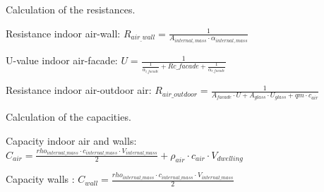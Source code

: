 Calculation of the resistances.
\newline

Resistance indoor air-wall: $R_{air_{\_}wall} = \frac{1}{A_{internal,mass} \cdot \alpha_{internal,mass}} $ 

U-value indoor air-facade: $U =\frac{1}{\frac{1}{\alpha_{i{\_}facade}}   + R{c{\_}facade} + \frac{1}{\alpha_{e{\_}facade}}}$ 

Resistance indoor air-outdoor air: $R_{air{\_}outdoor} = \frac{1}{A_{facade} \cdot U + A_{glass} \cdot U_{glass} + qm \cdot c_{air}}$ 
\newline

Calculation of the capacities.
\newline

Capacity indoor air and walls: $C_{air} =\frac{rho_{internal{\_}mass} \cdot c_{internal{\_}mass} \cdot V_{internal{\_}mass}}{2} + \rho_{air} \cdot c_{air} \cdot V_{dwelling}  $ 

Capacity walls : $C_{wall} =\frac{rho_{internal{\_}mass} \cdot c_{internal{\_}mass} \cdot V_{internal{\_}mass}}{2}$   

\newpage
  